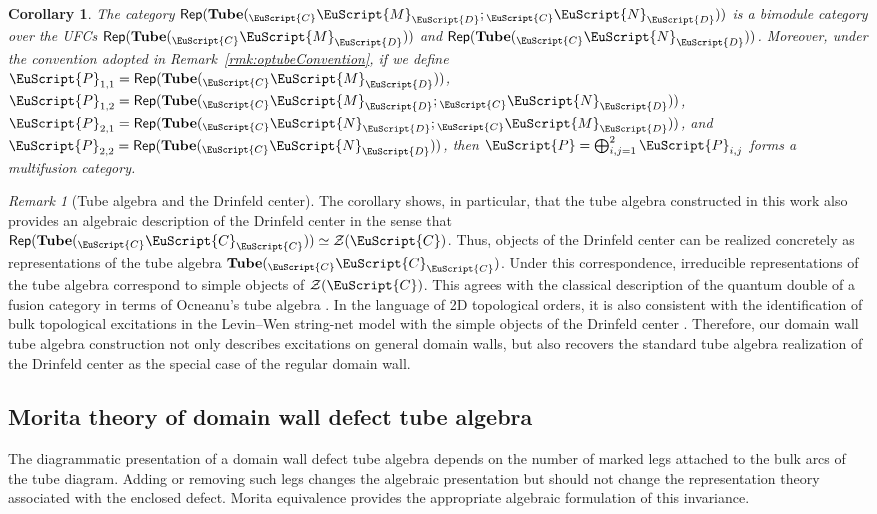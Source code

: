 \documentclass[a4paper,11pt]{article}
\newtheorem{corollary}[theorem]{Corollary}
\theoremstyle{definition}
\theoremstyle{remark}
\newtheorem{remark}[theorem]{Remark}
\newcommand\eC           {\EuScript{C}}
\newcommand\eD           {\EuScript{D}}
\newcommand\eM          {\EuScript{M}}
\newcommand\eN         {\EuScript{N}}
\newcommand\eP         {\EuScript{P}}
\newcommand{\Rep}{\mathsf{Rep}}
\newcommand{\Tube}{\mathbf{Tube}}
\begin{document}
\begin{corollary}
The category $\Rep(\Tube({}_\eC\eM_{\eD};{}_\eC\eN_{\eD}))$ is a bimodule category over the UFCs $\Rep(\Tube({}_\eC\eM_{\eD}))$ and $\Rep(\Tube({}_\eC\eN_{\eD}))$. Moreover, under the convention adopted in Remark~\ref{rmk:optubeConvention},   if we define
$\eP_{1,1}= \Rep(\Tube({}_\eC\eM_{\eD}))$,
$\eP_{1,2}= \Rep(\Tube({}_\eC\eM_{\eD};{}_\eC\eN_{\eD}))$,
$\eP_{2,1}= \Rep(\Tube({}_\eC\eN_{\eD};{}_\eC\eM_{\eD}))$, and
$\eP_{2,2}= \Rep(\Tube({}_\eC\eN_{\eD}))$,
then $\eP=\bigoplus_{i,j=1}^{2}\eP_{i,j}$ forms a multifusion category.
\end{corollary}

\begin{remark}[Tube algebra and the Drinfeld center]
    The corollary shows, in particular, that the tube algebra constructed in this work also provides an algebraic description of the Drinfeld center in the sense that $\Rep(\Tube({}_\eC\eC_\eC)) \simeq \mathcal{Z}(\eC)$. 
    Thus, objects of the Drinfeld center can be realized concretely as representations of the tube algebra $\Tube({}_\eC\eC_\eC)$. Under this  correspondence, irreducible representations of the tube algebra correspond to simple objects of $\mathcal Z(\eC)$. This agrees with the classical description of the quantum double of a fusion category in terms of Ocneanu's tube algebra \cite{ocneanu1994chirality,izumi2000structure,muger2003subfactorsI}. In the language of 2D topological orders, it is also consistent with the identification of bulk topological excitations in the Levin--Wen string-net model with the simple objects of the Drinfeld center \cite{Levin2005,Kitaev2012boundary}. Therefore, our domain wall tube algebra construction not only describes excitations on general domain walls, but also recovers the standard tube algebra realization of the Drinfeld center as the special case of the regular domain wall.
\end{remark}






\subsection{Morita theory of domain wall defect tube algebra}

The diagrammatic presentation of a domain wall defect tube algebra depends on the number of marked legs attached to the bulk arcs of the tube diagram. Adding or removing such legs changes the algebraic presentation but should not change the representation theory associated with the enclosed defect. Morita equivalence provides the appropriate algebraic formulation of this invariance.
\end{document}
